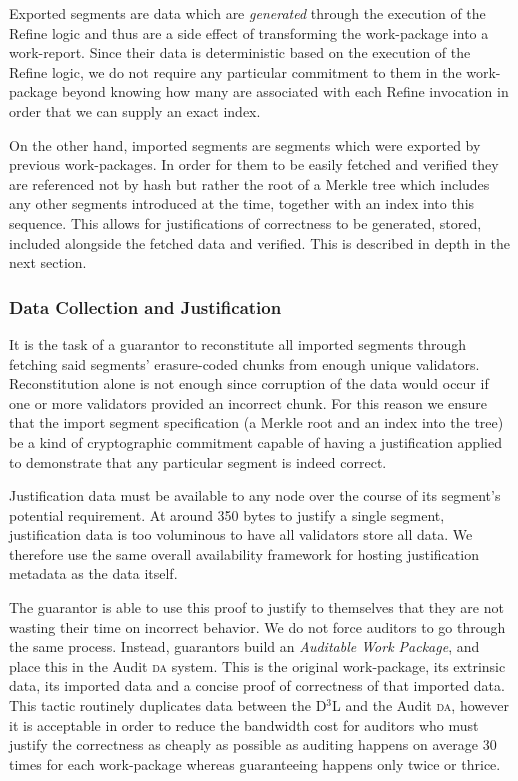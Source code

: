 Exported segments are data which are \emph{generated} through the execution of the Refine logic and thus are a side effect of transforming the work-package into a work-report. Since their data is deterministic based on the execution of the Refine logic, we do not require any particular commitment to them in the work-package beyond knowing how many are associated with each Refine invocation in order that we can supply an exact index.

On the other hand, imported segments are segments which were exported by previous work-packages. In order for them to be easily fetched and verified they are referenced not by hash but rather the root of a Merkle tree which includes any other segments introduced at the time, together with an index into this sequence. This allows for justifications of correctness to be generated, stored, included alongside the fetched data and verified. This is described in depth in the next section.

\subsubsection{Data Collection and Justification}


It is the task of a guarantor to reconstitute all imported segments through fetching said segments' erasure-coded chunks from enough unique validators. Reconstitution alone is not enough since corruption of the data would occur if one or more validators provided an incorrect chunk. For this reason we ensure that the import segment specification (a Merkle root and an index into the tree) be a kind of cryptographic commitment capable of having a justification applied to demonstrate that any particular segment is indeed correct.

Justification data must be available to any node over the course of its segment's potential requirement. At around 350 bytes to justify a single segment, justification data is too voluminous to have all validators store all data. We therefore use the same overall availability framework for hosting justification metadata as the data itself.

The guarantor is able to use this proof to justify to themselves that they are not wasting their time on incorrect behavior. We do not force auditors to go through the same process. Instead, guarantors build an \emph{Auditable Work Package}, and place this in the Audit \textsc{da} system. This is the original work-package, its extrinsic data, its imported data and a concise proof of correctness of that imported data. This tactic routinely duplicates data between the D$^3$L and the Audit \textsc{da}, however it is acceptable in order to reduce the bandwidth cost for auditors who must justify the correctness as cheaply as possible as auditing happens on average 30 times for each work-package whereas guaranteeing happens only twice or thrice.

